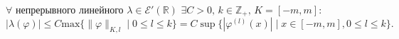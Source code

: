 \begin{to_thr}
	$\forall$ непрерывного линейного $\lambda \in \mathcal{E}'(\mathbb{R})$ $\exists C>0, \, k \in \mathbb{Z}_+,\, K= [-m,m]:$
	\begin{equation*}
		|\lambda(\varphi)| \leq C \text{max} \{\|\varphi\|_{K,l} \mid 0\leq l \leq k\} = C \sup \{|\varphi^{(l)}(x)| \mid x \in [-m,m], 0 \leq l \leq k\}.
	\end{equation*}
\end{to_thr}